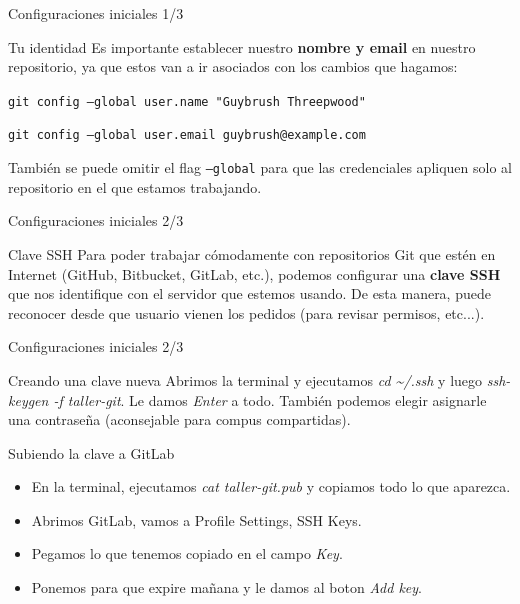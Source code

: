 \begin{frame}[fragile]{Configuraciones iniciales 1/3}

    \begin{block}{Tu identidad}
        Es importante establecer nuestro \textbf{nombre y email} en nuestro repositorio, ya que estos van a ir asociados con los cambios que hagamos:

        \vspace{0.5em}

        \texttt{git config --global user.name "Guybrush Threepwood"}

        \texttt{git config --global user.email guybrush@example.com}

    También se puede omitir el flag \texttt{--global} para que las credenciales apliquen solo al repositorio en el que estamos trabajando.
        \end{block}
\end{frame}
\begin{frame}[fragile]{Configuraciones iniciales 2/3}

	\begin{block}{Clave SSH}
		Para poder trabajar cómodamente con repositorios Git que estén en Internet (GitHub, Bitbucket, GitLab, etc.), podemos configurar una \textbf{clave SSH} que nos identifique con el servidor que estemos usando. De esta manera, puede reconocer desde que usuario vienen los pedidos (para revisar permisos, etc...).

	\end{block}
\end{frame}

\begin{frame}{Configuraciones iniciales 2/3}
  \begin{block}{Creando una clave nueva}
		Abrimos la terminal y ejecutamos \textit{cd \textasciitilde/.ssh} y luego \textit{ssh-keygen -f taller-git}. Le damos \textit{Enter} a todo. También podemos elegir asignarle una contraseña (aconsejable para compus compartidas).
	\end{block}
  \pause
  \begin{block}{Subiendo la clave a GitLab}
		\begin{itemize}
		\item En la terminal, ejecutamos \textit{cat taller-git.pub} y copiamos todo lo que aparezca.
      \item Abrimos GitLab, vamos a Profile Settings, SSH Keys.
      \item Pegamos lo que tenemos copiado en el campo \textit{Key}.
      \item Ponemos para que expire mañana y le damos al boton \textit{Add key}.
		\end{itemize}
	\end{block}
\end{frame}


